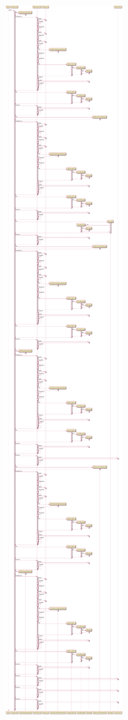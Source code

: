 \includegraphics[width=\textwidth,height=\textheight,keepaspectratio]{Schemas/UserServlet_doGet.svg.pdf}

